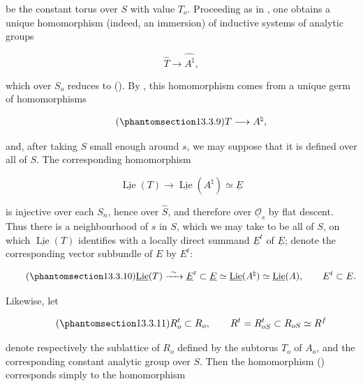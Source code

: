\noindent
be the constant torus over $S$ with value $T_o$. Proceeding as in ,
one obtains a unique homomorphism (indeed, an immersion) of inductive
systems of analytic groups

\begin{equation*}
 \widehat T\longrightarrow\widehat{A^\natural},
\end{equation*}

\noindent
which over $S_o$ reduces to (). By , this homomorphism comes
from a unique germ of homomorphisms

\begin{equation}\tag{\SGARefTarget{sga7.sga7i.eix.n13-3-9}{13.3.9}}
 T\longrightarrow A^\natural,
\end{equation}

\noindent
and, after taking $S$ small enough around $s$, we may suppose that it is
defined over all of $S$. The corresponding homomorphism

\begin{equation*}
 \underline{\operatorname{Lie}}(T)\longrightarrow
 \underline{\operatorname{Lie}}(A^\natural)\simeq\underline E
\end{equation*}

\noindent
is injective over each $S_n$, hence over $\widehat S$, and therefore over
$\underline{\mathcal O}_s$ by flat descent. Thus there is a neighbourhood
of $s$ in $S$, which we may take to be all of $S$, on which
$\underline{\operatorname{Lie}}(T)$ identifies with a locally direct
summand $\underline E^t$ of $\underline E$; denote the corresponding
vector subbundle of $E$ by $E^t$:

\begin{equation}\tag{\SGARefTarget{sga7.sga7i.eix.n13-3-10}{13.3.10}}
 \underline{\operatorname{Lie}}(T)\xrightarrow{\ \sim\ }
 \underline E^t\subset\underline E\simeq
 \underline{\operatorname{Lie}}(A^\natural)\simeq
 \underline{\operatorname{Lie}}(A),
 \qquad E^t\subset E.
\end{equation}

\noindent
Likewise, let

\begin{equation}\tag{\SGARefTarget{sga7.sga7i.eix.n13-3-11}{13.3.11}}
 R_o^t\subset R_o,
 \qquad R^t=R_{oS}^t\subset R_{oS}\simeq R^f
\end{equation}

\noindent
denote respectively the sublattice of $R_o$ defined by the subtorus
$T_o$ of $A_o$, and the corresponding constant analytic group over $S$.
Then the homomorphism () corresponds simply to the homomorphism

